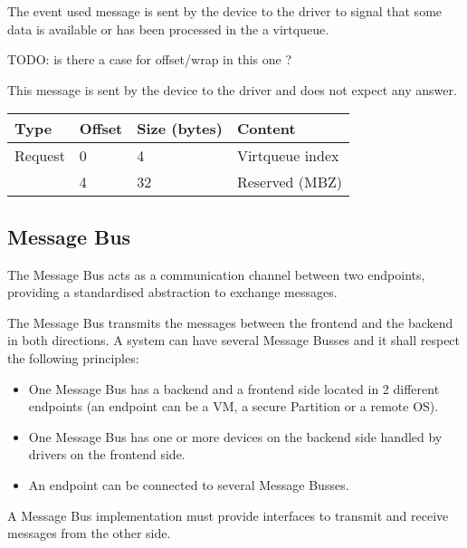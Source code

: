 
The event used message is sent by the device to the driver to signal that some
data is available or has been processed in the a virtqueue.

TODO: is there a case for offset/wrap in this one ?

This message is sent by the device to the driver and does not expect any
answer.

\begin{tabular}{|l|l|l|l|}
\hline
Type & Offset & Size (bytes) & Content \\
\hline \hline
Request & 0 & 4 & Virtqueue index \\
& 4 & 32 & Reserved (MBZ) \\
\hline
\end{tabular}

\subsection{Message Bus}\label{sec:Virtio Transport Options / Virtio Over Messages / Message Bus}

The Message Bus acts as a communication channel between two endpoints,
providing a standardised abstraction to exchange messages.

The Message Bus transmits the messages between the frontend and the backend in
both directions.
A system can have several Message Busses and it shall respect the following
principles:

\begin{itemize}
\item One Message Bus has a backend and a frontend side located in 2 different
      endpoints (an endpoint can be a VM, a secure Partition or a remote OS).
\item One Message Bus has one or more devices on the backend side handled by
      drivers on the frontend side.
\item An endpoint can be connected to several Message Busses.
\end{itemize}

A Message Bus implementation must provide interfaces to transmit and receive
messages from the other side.


